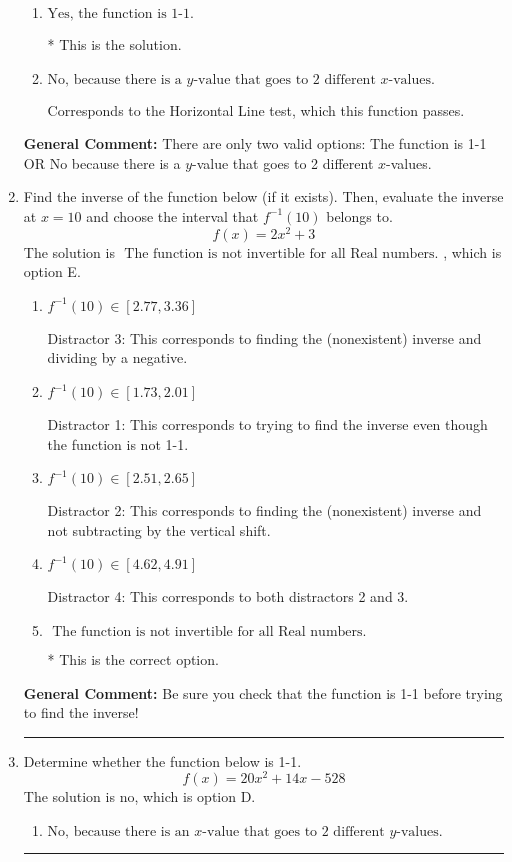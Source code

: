 \documentclass{extbook}[14pt]
\newcommand{\litem}[1]{\item #1

\rule{\textwidth}{0.4pt}}
\begin{document}
\begin{enumerate}
{\begin{enumerate}[label=\Alph*.]
Corresponds to believing 1-1 means the range is all Real numbers.
\item \( \text{Yes, the function is 1-1.} \)

* This is the solution.
\item \( \text{No, because there is a $y$-value that goes to 2 different $x$-values.} \)

Corresponds to the Horizontal Line test, which this function passes.
\end{enumerate}

\textbf{General Comment:} There are only two valid options: The function is 1-1 OR No because there is a $y$-value that goes to 2 different $x$-values.
}
\litem{
Find the inverse of the function below (if it exists). Then, evaluate the inverse at $x = 10$ and choose the interval that $f^{-1}(10)$ belongs to.
\[ f(x) = 2 x^2 + 3 \]
The solution is \( \text{ The function is not invertible for all Real numbers. } \), which is option E.\begin{enumerate}[label=\Alph*.]
\item \( f^{-1}(10) \in [2.77, 3.36] \)

 Distractor 3: This corresponds to finding the (nonexistent) inverse and dividing by a negative.
\item \( f^{-1}(10) \in [1.73, 2.01] \)

 Distractor 1: This corresponds to trying to find the inverse even though the function is not 1-1. 
\item \( f^{-1}(10) \in [2.51, 2.65] \)

 Distractor 2: This corresponds to finding the (nonexistent) inverse and not subtracting by the vertical shift.
\item \( f^{-1}(10) \in [4.62, 4.91] \)

 Distractor 4: This corresponds to both distractors 2 and 3.
\item \( \text{ The function is not invertible for all Real numbers. } \)

* This is the correct option.
\end{enumerate}

\textbf{General Comment:} Be sure you check that the function is 1-1 before trying to find the inverse!
}
\litem{
Determine whether the function below is 1-1.
\[ f(x) = 20 x^2 + 14 x - 528 \]
The solution is \( \text{no} \), which is option D.\begin{enumerate}[label=\Alph*.]
\item \( \text{No, because there is an $x$-value that goes to 2 different $y$-values.} \)


\end{enumerate}}
\end{enumerate}
\end{document}
